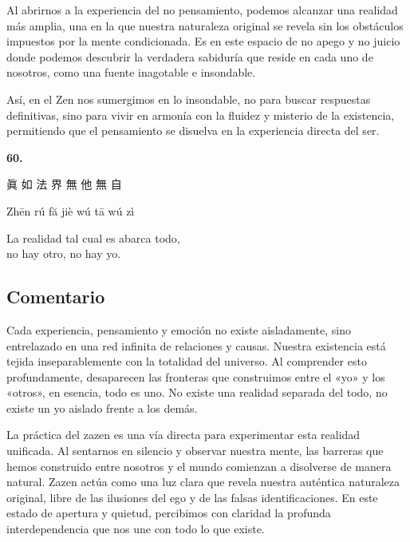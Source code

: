 \documentclass[
  a5paperpaper,
]{article}
\begin{document}
Al abrirnos a la experiencia del no pensamiento, podemos alcanzar una
realidad más amplia, una en la que nuestra naturaleza original se revela
sin los obstáculos impuestos por la mente condicionada. Es en este
espacio de no apego y no juicio donde podemos descubrir la verdadera
sabiduría que reside en cada uno de nosotros, como una fuente inagotable
e insondable.

Así, en el Zen nos sumergimos en lo insondable, no para buscar
respuestas definitivas, sino para vivir en armonía con la fluidez y
misterio de la existencia, permitiendo que el pensamiento se disuelva en
la experiencia directa del ser.

\hfill\break

\hypertarget{05}{}
\begin{verseblock}

\newpage

\begin{center}\textbf{60.}\end{center}

眞 如 法 界 無 他 無 自

Zhēn rú fă jiè wú tā wú zì

La realidad tal cual es abarca todo,\\
no hay otro, no hay yo.

\end{verseblock}

\hfill\break

\hypertarget{comentario-59}{%
\subsection{Comentario}\label{comentario-59}}

Cada experiencia, pensamiento y emoción no existe aisladamente, sino
entrelazado en una red infinita de relaciones y causas. Nuestra
existencia está tejida inseparablemente con la totalidad del universo.
Al comprender esto profundamente, desaparecen las fronteras que
construimos entre el «yo» y los «otros», en esencia, todo es uno. No
existe una realidad separada del todo, no existe un yo aislado frente a
los demás.

La práctica del zazen es una vía directa para experimentar esta realidad
unificada. Al sentarnos en silencio y observar nuestra mente, las
barreras que hemos construido entre nosotros y el mundo comienzan a
disolverse de manera natural. Zazen actúa como una luz clara que revela
nuestra auténtica naturaleza original, libre de las ilusiones del ego y
de las falsas identificaciones. En este estado de apertura y quietud,
percibimos con claridad la profunda interdependencia que nos une con
todo lo que existe.
\end{document}
